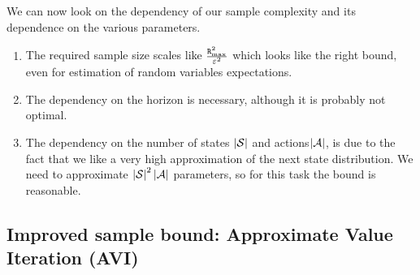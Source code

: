 We can now look on the dependency of our sample complexity and its
dependence on the various parameters.
\begin{enumerate}
	\item The required sample size scales like $\frac{{\tt R}_{\max }^{2}}{\varepsilon^{2}}$
	which looks like the right bound, even for estimation of random variables
	expectations. 
	\item The dependency on the horizon is necessary, although it is probably
	not optimal. 
	\item The dependency on the number of states $\left|\mathcal{S}\right|$
	and actions$\left|\mathcal{A}\right|$, is due to the fact that we
	like a very high approximation of the next state distribution. We
	need to approximate $\left|\mathcal{S}\right|^{2}\left|\mathcal{A}\right|$
	parameters, so for this task the bound is reasonable. 
\end{enumerate}

\subsection{Improved sample bound: Approximate Value
Iteration (AVI)}

